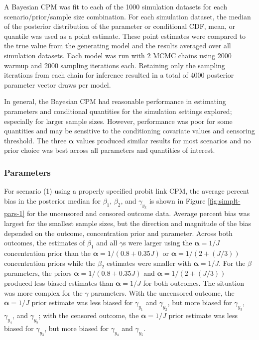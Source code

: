 \documentclass[
]{article}
\begin{document}
A Bayesian CPM was fit to each of the 1000 simulation datasets for each scenario/prior/sample size combination. For each simulation dataset, the median of the posterior distribution of the parameter or conditional CDF, mean, or quantile was used as a point estimate. These point estimates were compared to the true value from the generating model and the results averaged over all simulation datasets. Each model was run with 2 MCMC chains using 2000 warmup and 2000 sampling iterations each. Retaining only the sampling iterations from each chain for inference resulted in a total of 4000 posterior parameter vector draws per model.

In general, the Bayesian CPM had reasonable performance in estimating parameters and conditional quantities for the simulation settings explored; especially for larger sample sizes. However, performance was poor for some quantities and may be sensitive to the conditioning covariate values and censoring threshold. The three \(\boldsymbol{\alpha}\) values produced similar results for most scenarios and no prior choice was best across all parameters and quantities of interest.

\hypertarget{parameters}{%
\subsubsection{Parameters}\label{parameters}}

For scenario (1) using a properly specified probit link CPM, the average percent bias in the posterior median for \(\beta_1\), \(\beta_2\), and \(\gamma_{y_k}\) is shown in Figure \ref{fig:simplt-pars-1} for the uncensored and censored outcome data. Average percent bias was largest for the smallest sample sizes, but the direction and magnitude of the bias depended on the outcome, concentration prior and parameter. Across both outcomes, the estimates of \(\beta_1\) and all \(\gamma\)s were larger using the \(\boldsymbol{\alpha}=1/J\) concentration prior than the \(\boldsymbol{\alpha}=1/(0.8+0.35J)\) or \(\boldsymbol{\alpha}=1/(2+(J/3))\) concentration priors while the \(\beta_2\) estimates were smaller with \(\boldsymbol{\alpha}=1/J\). For the \(\beta\) parameters, the priors \(\boldsymbol{\alpha}=1/(0.8+0.35J)\) and \(\boldsymbol{\alpha}=1/(2+(J/3))\) produced less biased estimates than \(\boldsymbol{\alpha}=1/J\) for both outcomes. The situation was more complex for the \(\gamma\) parameters. With the uncensored outcome, the \(\boldsymbol{\alpha}=1/J\) prior estimate was less biased for \(\gamma_{y_1}\) and \(\gamma_{y_2}\), but more biased for \(\gamma_{y_3}\), \(\gamma_{y_4}\), and \(\gamma_{y_5}\); with the censored outcome, the \(\boldsymbol{\alpha}=1/J\) prior estimate was less biased for \(\gamma_{y_3}\), but more biased for \(\gamma_{y_4}\) and \(\gamma_{y_5}\).
\end{document}
